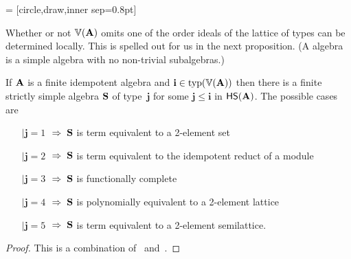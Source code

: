 \newcommand{\dotsize}{0.8pt}
 = [circle,draw,inner sep=\dotsize]
\begin{center}
\newcommand{\figscale}{.7}
\end{center}
Whether or not $\operatorname{\mathbb{V}}(\mathbf{A})$ omits one of the order ideals of the lattice of types can be
determined locally.  This is spelled out for us in the next proposition.
(A  algebra is a simple
algebra with no non-trivial subalgebras.)


\begin{prop}
  \label{prop:2.1}
If $\mathbf{A}$ is a finite idempotent algebra and 
$\mathbf{i} \in \operatorname{typ}(\operatorname{\mathbb{V}}(\mathbf{A}))$ then there
is a finite strictly simple algebra $\mathbf{S}$ of 
type~$\mathbf{j}$ for 
some $\mathbf{j} \leq \mathbf{i}$ in $\mathsf{H} \mathsf{S} (\mathbf{A})$.
The possible cases are
\begin{itemize}
\item[$\mid \mathbf{j} = 1$] $\;\Rightarrow \;\mathbf{S}$ is term equivalent to a 2-element set
\item[$\mid \mathbf{j} = 2$] $\;\Rightarrow \;\mathbf{S}$ is term equivalent to the idempotent reduct of a module
\item[$\mid \mathbf{j} = 3$] $\;\Rightarrow \;\mathbf{S}$ is functionally complete
\item[$\mid \mathbf{j} = 4$] $\;\Rightarrow \;\mathbf{S}$ is polynomially equivalent to a 2-element lattice
\item[$\mid \mathbf{j} = 5$] $\;\Rightarrow \;\mathbf{S}$ is term equivalent to a 2-element semilattice.
\end{itemize} %
\end{prop}
\begin{proof}
  This is a combination of~\cite[Proposition~3.1]{MR2504025} and~\cite[Theorem~6.1]{MR1191235}.
\end{proof}

